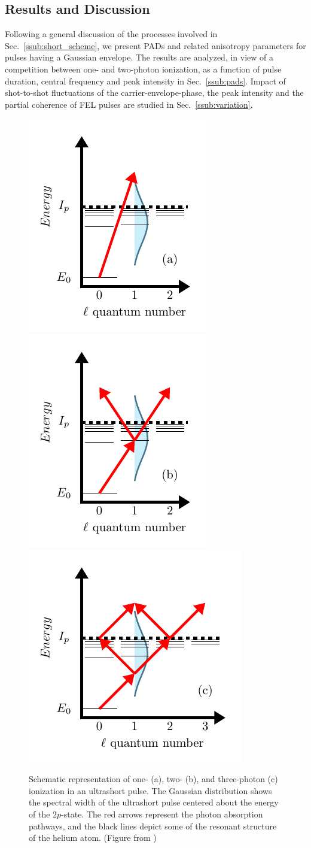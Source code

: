 \subsection{Results and Discussion}

Following a general discussion of the processes involved in Sec.~\ref{ssub:short_scheme}, we present PADs and related anisotropy parameters for pulses having a Gaussian envelope. The results are analyzed, in view of a competition between one- and two-photon ionization, as a function of pulse duration, central frequency and peak intensity in Sec.~\ref{ssub:pads}. Impact of shot-to-shot fluctuations of the carrier-envelope-phase, the peak intensity and the partial coherence of FEL pulses are studied in Sec.~\ref{ssub:variation}.

\begin{figure}[!ht]
\centering
\includegraphics[width=.3\linewidth]{figs/Photo_ionization/short_pulse/scheme_1-photon.pdf}
\includegraphics[width=.3\linewidth]{figs/Photo_ionization/short_pulse/scheme_2-photon.pdf}
\includegraphics[width=.36\linewidth]{figs/Photo_ionization/short_pulse/scheme_3-photon.pdf}
\caption{
Schematic representation of one- (a), two- (b), and three-photon (c) ionization in an ultrashort pulse. The Gaussian distribution shows the spectral width of the ultrashort pulse centered about the energy of the $2p$-state. The red arrows represent the photon absorption pathways, and the black lines depict some of the resonant structure of the helium atom. (Figure from \cite{venzke2020_ionization})
} 
  \label{fig:scheme_short}
\end{figure}

